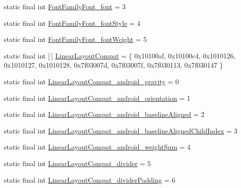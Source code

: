 \begin{DoxyCompactItemize}
\item 
static final int \mbox{\hyperlink{classcom_1_1synnapps_1_1carouselview_1_1_r_1_1styleable_a7d16661fee6fe311df05d8428b2d2cea}{Font\+Family\+Font\+\_\+font}} = 3
\item 
static final int \mbox{\hyperlink{classcom_1_1synnapps_1_1carouselview_1_1_r_1_1styleable_a41b82070e44e8d5b586b14d25d718ced}{Font\+Family\+Font\+\_\+font\+Style}} = 4
\item 
static final int \mbox{\hyperlink{classcom_1_1synnapps_1_1carouselview_1_1_r_1_1styleable_ae0f3b6d39b365c65c3d1044ecb0ead51}{Font\+Family\+Font\+\_\+font\+Weight}} = 5
\item 
static final int \mbox{[}$\,$\mbox{]} \mbox{\hyperlink{classcom_1_1synnapps_1_1carouselview_1_1_r_1_1styleable_a41e7cfc41d293bf93fd86a02e6c4dc31}{Linear\+Layout\+Compat}} = \{ 0x10100af, 0x10100c4, 0x1010126, 0x1010127, 0x1010128, 0x7f03007d, 0x7f03007f, 0x7f030113, 0x7f030147 \}
\item 
static final int \mbox{\hyperlink{classcom_1_1synnapps_1_1carouselview_1_1_r_1_1styleable_a9a7705ac8dcd42dc418c4f7def63ad6b}{Linear\+Layout\+Compat\+\_\+android\+\_\+gravity}} = 0
\item 
static final int \mbox{\hyperlink{classcom_1_1synnapps_1_1carouselview_1_1_r_1_1styleable_ad8f7f6019caf65e57e88487c68d0b6d0}{Linear\+Layout\+Compat\+\_\+android\+\_\+orientation}} = 1
\item 
static final int \mbox{\hyperlink{classcom_1_1synnapps_1_1carouselview_1_1_r_1_1styleable_ae05e28ccfa1db13cff7fede07be7bf31}{Linear\+Layout\+Compat\+\_\+android\+\_\+baseline\+Aligned}} = 2
\item 
static final int \mbox{\hyperlink{classcom_1_1synnapps_1_1carouselview_1_1_r_1_1styleable_a535002e2eb45b3adeaf9ffa31034a7df}{Linear\+Layout\+Compat\+\_\+android\+\_\+baseline\+Aligned\+Child\+Index}} = 3
\item 
static final int \mbox{\hyperlink{classcom_1_1synnapps_1_1carouselview_1_1_r_1_1styleable_ae7f303769a9d88f91b92318e91914b5b}{Linear\+Layout\+Compat\+\_\+android\+\_\+weight\+Sum}} = 4
\item 
static final int \mbox{\hyperlink{classcom_1_1synnapps_1_1carouselview_1_1_r_1_1styleable_ace451fbc6534b6a9db1942a40202c74a}{Linear\+Layout\+Compat\+\_\+divider}} = 5
\item 
static final int \mbox{\hyperlink{classcom_1_1synnapps_1_1carouselview_1_1_r_1_1styleable_a770f2668efdf68abeb55f127aff14d29}{Linear\+Layout\+Compat\+\_\+divider\+Padding}} = 6
\item 

\end{DoxyCompactItemize}
